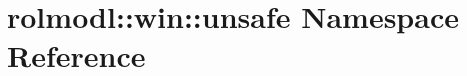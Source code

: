\hypertarget{namespacerolmodl_1_1win_1_1unsafe}{}\section{rolmodl\+::win\+::unsafe Namespace Reference}
\label{namespacerolmodl_1_1win_1_1unsafe}

